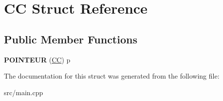 \hypertarget{struct_c_c}{\section{C\-C Struct Reference}
\label{struct_c_c}
}
\subsection*{Public Member Functions}
\begin{DoxyCompactItemize}
\item 
\hypertarget{struct_c_c_a44f3e83081f562b68aec02302ad13e91}{{\bfseries P\-O\-I\-N\-T\-E\-U\-R} (\hyperlink{struct_c_c}{C\-C}) p}\label{struct_c_c_a44f3e83081f562b68aec02302ad13e91}

\end{DoxyCompactItemize}


The documentation for this struct was generated from the following file\-:\begin{DoxyCompactItemize}
\item 
src/main.\-cpp\end{DoxyCompactItemize}
